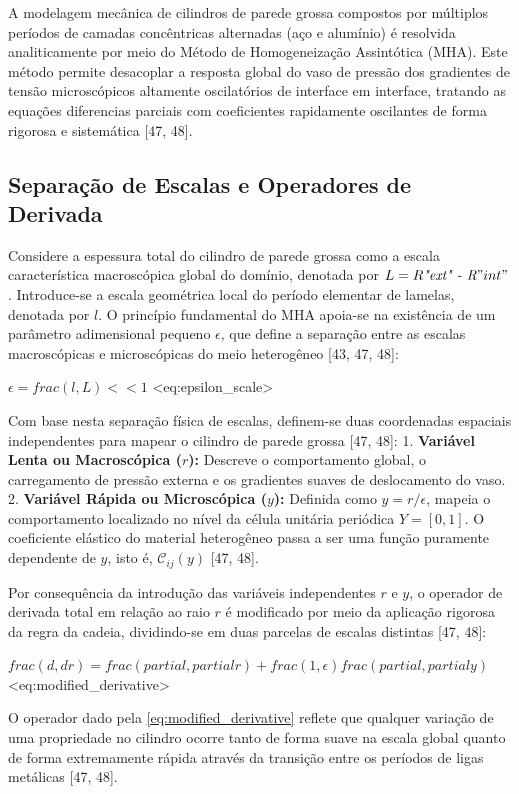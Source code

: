 A modelagem mecânica de cilindros de parede grossa compostos por múltiplos períodos de camadas concêntricas alternadas (aço e alumínio) é resolvida analiticamente por meio do Método de Homogeneização Assintótica (MHA). Este método permite desacoplar a resposta global do vaso de pressão dos gradientes de tensão microscópicos altamente oscilatórios de interface em interface, tratando as equações diferencias parciais com coeficientes rapidamente oscilantes de forma rigorosa e sistemática [47, 48].

\subsection{Separação de Escalas e Operadores de Derivada}

Considere a espessura total do cilindro de parede grossa como a escala característica macroscópica global do domínio, denotada por $L = R\textit{"ext" - R}"int"$. Introduce-se a escala geométrica local do período elementar de lamelas, denotada por $l$. O princípio fundamental do MHA apoia-se na existência de um parâmetro adimensional pequeno $\epsilon$, que define a separação entre as escalas macroscópicas e microscópicas do meio heterogêneo [43, 47, 48]:

$ \epsilon = frac(l, L) << 1 $ <eq:epsilon_scale>

Com base nesta separação física de escalas, definem-se duas coordenadas espaciais independentes para mapear o cilindro de parede grossa [47, 48]:
1. \textbf{Variável Lenta ou Macroscópica ($r$):} Descreve o comportamento global, o carregamento de pressão externa e os gradientes suaves de deslocamento do vaso.
2. \textbf{Variável Rápida ou Microscópica ($y$):} Definida como $y = r/\epsilon$, mapeia o comportamento localizado no nível da célula unitária periódica $Y = [0, 1]$. O coeficiente elástico do material heterogêneo passa a ser uma função puramente dependente de $y$, isto é, $\mathcal{C}_{i j}(y)$ [47, 48].

Por consequência da introdução das variáveis independentes $r$ e $y$, o operador de derivada total em relação ao raio $r$ é modificado por meio da aplicação rigorosa da regra da cadeia, dividindo-se em duas parcelas de escalas distintas [47, 48]:

$ frac(d, d r) = frac(partial, partial r) + frac(1, \epsilon) frac(partial, partial y) $ <eq:modified_derivative>

O operador dado pela \eqref{eq:modified_derivative} reflete que qualquer variação de uma propriedade no cilindro ocorre tanto de forma suave na escala global quanto de forma extremamente rápida através da transição entre os períodos de ligas metálicas [47, 48].

